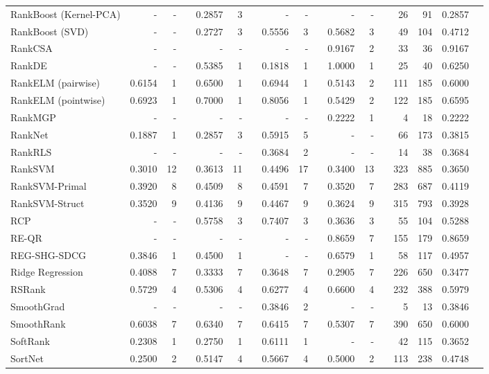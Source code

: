 \documentclass{sig-alternate-2013}
\begin{document}
\begin{longtable}[!hp]{@{}lrrrrrrrrrrrrrrrr@{}}
RankBoost (Kernel-PCA) & - & - && 0.2857 & 3 && - & - && - & - && 26 & 91 & 0.2857 \\
RankBoost (SVD) & - & - && 0.2727 & 3 && 0.5556 & 3 && 0.5682 & 3 && 49 & 104 & 0.4712 \\
RankCSA & - & - && - & - && - & - && 0.9167 & 2 && 33 & 36 & 0.9167 \\
RankDE & - & - && 0.5385 & 1 && 0.1818 & 1 && 1.0000 & 1 && 25 & 40 & 0.6250 \\
RankELM (pairwise) & 0.6154 & 1 && 0.6500 & 1 && 0.6944 & 1 && 0.5143 & 2 && 111 & 185 & 0.6000 \\
RankELM (pointwise) & 0.6923 & 1 && 0.7000 & 1 && 0.8056 & 1 && 0.5429 & 2 && 122 & 185 & 0.6595 \\
RankMGP & - & - && - & - && - & - && 0.2222 & 1 && 4 & 18 & 0.2222 \\
RankNet & 0.1887 & 1 && 0.2857 & 3 && 0.5915 & 5 && - & - && 66 & 173 & 0.3815 \\
RankRLS & - & - && - & - && 0.3684 & 2 && - & - && 14 & 38 & 0.3684 \\
RankSVM & 0.3010 & 12 && 0.3613 & 11 && 0.4496 & 17 && 0.3400 & 13 && 323 & 885 & 0.3650 \\
RankSVM-Primal & 0.3920 & 8 && 0.4509 & 8 && 0.4591 & 7 && 0.3520 & 7 && 283 & 687 & 0.4119 \\
RankSVM-Struct & 0.3520 & 9 && 0.4136 & 9 && 0.4467 & 9 && 0.3624 & 9 && 315 & 793 & 0.3928 \\
RCP & - & - && 0.5758 & 3 && 0.7407 & 3 && 0.3636 & 3 && 55 & 104 & 0.5288 \\
RE-QR & - & - && - & - && - & - && 0.8659 & 7 && 155 & 179 & 0.8659 \\
REG-SHG-SDCG & 0.3846 & 1 && 0.4500 & 1 && - & - && 0.6579 & 1 && 58 & 117 & 0.4957 \\
Ridge Regression & 0.4088 & 7 && 0.3333 & 7 && 0.3648 & 7 && 0.2905 & 7 && 226 & 650 & 0.3477 \\
RSRank & 0.5729 & 4 && 0.5306 & 4 && 0.6277 & 4 && 0.6600 & 4 && 232 & 388 & 0.5979 \\
SmoothGrad & - & - && - & - && 0.3846 & 2 && - & - && 5 & 13 & 0.3846 \\
SmoothRank & 0.6038 & 7 && 0.6340 & 7 && 0.6415 & 7 && 0.5307 & 7 && 390 & 650 & 0.6000 \\
SoftRank & 0.2308 & 1 && 0.2750 & 1 && 0.6111 & 1 && - & - && 42 & 115 & 0.3652 \\
SortNet & 0.2500 & 2 && 0.5147 & 4 && 0.5667 & 4 && 0.5000 & 2 && 113 & 238 & 0.4748 \\

\end{longtable}
\end{document}
